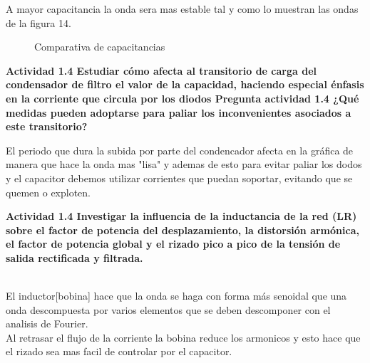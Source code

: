 ﻿\documentclass[letterpaper]{article}
\begin{document}
A mayor capacitancia la onda sera mas estable tal y como lo muestran las ondas de la figura 14.\newpage
\begin{figure}[htb]
    \centering
    \caption{Comparativa de capacitancias}
    \label{fig:my_labeel}
\end{figure}
 \begin{large}

\textbf{Actividad 1.4 Estudiar cómo afecta al transitorio de carga del condensador
de filtro el valor de la capacidad, haciendo especial énfasis en la
corriente que circula por los diodos Pregunta actividad 1.4 ¿Qué medidas
pueden adoptarse para paliar los inconvenientes asociados a este transitorio?}\end{large}

\begin{large}
El periodo que dura la subida por parte del condencador afecta en la gráfica de manera que hace la onda mas "lisa" y ademas de esto para evitar paliar los dodos y el capacitor debemos utilizar corrientes que puedan soportar, evitando que se quemen o exploten.

\textbf{Actividad 1.4 Investigar la influencia de la inductancia de la red
(LR) sobre el factor de potencia del desplazamiento, la distorsión
armónica, el factor de potencia global y el rizado pico a pico de
la tensión de salida rectificada y filtrada.}\end{large}\\
El inductor[bobina] hace que la onda se haga con forma más senoidal que una onda descompuesta por varios elementos que se deben descomponer con el analisis de Fourier.\\
Al retrasar el flujo de la corriente la bobina reduce los armonicos y esto hace que el rizado sea mas facil de controlar por el capacitor.
\end{document}
